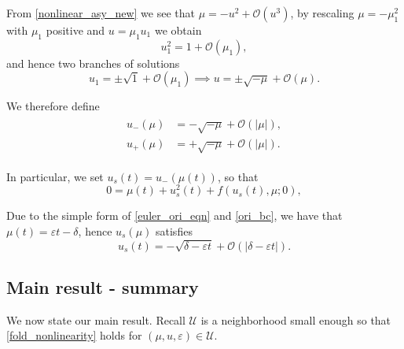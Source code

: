 \documentclass[letterpaper,11pt]{article}
\newcommand{\rmO}{\mathcal{O}}
\newcommand{\eps}{\varepsilon}
\numberwithin{equation}{section}
\theoremstyle{plain}
\begin{document}
From \eqref{nonlinear_asy_new} we see that $\mu = -u^2+\rmO(u^3)$, by rescaling $\mu = -\mu_1^2$ with $\mu_1$ positive and $u=\mu_1 u_1$ we obtain
\[
u_1^2 = 1 + \rmO(\mu_1),
\]
and hence two branches of solutions
\[
u_1 = \pm \sqrt{1}+\rmO(\mu_1) \implies u = \pm \sqrt{-\mu}+\rmO(\mu).
\]

We therefore define
\begin{align}
\begin{split}
u_-(\mu) &= -\sqrt{-\mu} + \rmO(|\mu|),\\
u_+(\mu) &= +\sqrt{-\mu} + \rmO(|\mu|).
\end{split}
\end{align}


In particular, we set $u_s(t)=u_-(\mu(t))$, so that
\begin{equation}\label{singular}
0 = \mu(t) + u_s^2(t)+f(u_s(t),\mu; 0),
\end{equation}

Due to the simple form of \eqref{euler_ori_eqn} and \eqref{ori_bc}, we have that $\mu(t)= \eps t-\delta$, hence $u_s(\mu)$ satisfies
\begin{equation}\label{singularAsy}
u_s(t) = -\sqrt{\delta-\eps t} + \rmO(|\delta-\eps t|).
\end{equation}


\subsection{Main result - summary} \label{main_sum}

We now state our main result. Recall $\mathcal{U}$ is a neighborhood small enough so that \eqref{fold_nonlinearity} holds for $(\mu, u , \eps) \in \mathcal{U}$.
\end{document}
